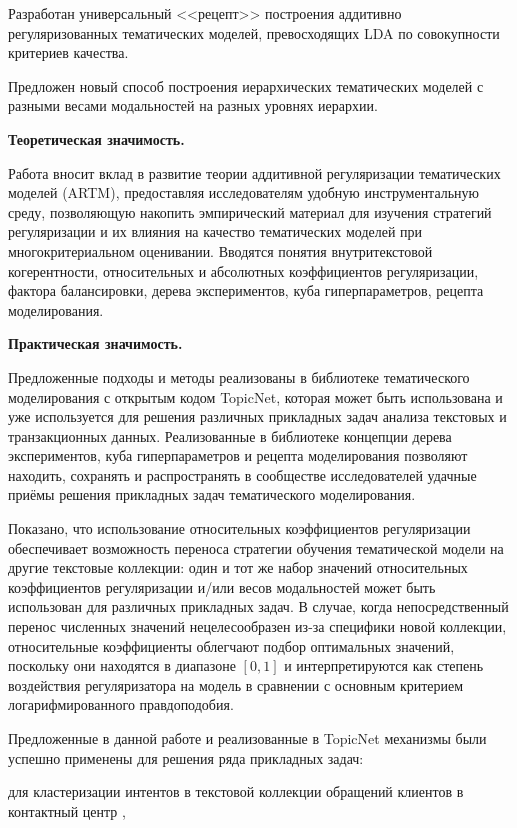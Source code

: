 Разработан универсальный <<рецепт>> построения аддитивно регуляризованных тематических моделей, превосходящих LDA по совокупности критериев качества.

Предложен новый способ построения иерархических тематических моделей с разными весами модальностей на разных уровнях иерархии.

\textbf{Теоретическая значимость.}

Работа вносит вклад в развитие теории аддитивной регуляризации тематических моделей (ARTM), предоставляя исследователям удобную инструментальную среду, позволяющую накопить эмпирический материал для изучения стратегий регуляризации и их влияния на качество тематических моделей при многокритериальном оценивании. Вводятся понятия внутритекстовой когерентности, относительных и абсолютных коэффициентов регуляризации, фактора балансировки, дерева экспериментов, куба гиперпараметров, рецепта моделирования.

\textbf{Практическая значимость.}

Предложенные подходы и методы реализованы в библиотеке тематического моделирования с открытым кодом TopicNet, которая может быть использована и уже используется для решения различных прикладных задач анализа текстовых и транзакционных данных. Реализованные в библиотеке концепции дерева экспериментов, куба гиперпараметров и рецепта моделирования позволяют находить, сохранять и распространять в сообществе исследователей удачные приёмы решения прикладных задач тематического моделирования.

Показано, что использование относительных коэффициентов регуляризации обеспечивает возможность переноса стратегии обучения тематической модели на другие текстовые коллекции: один и тот же набор значений относительных коэффициентов регуляризации и/или весов модальностей может быть использован для различных прикладных задач. В случае, когда непосредственный перенос численных значений нецелесообразен из-за специфики новой коллекции, относительные коэффициенты облегчают подбор оптимальных значений, поскольку они находятся в диапазоне $[0, 1]$ и интерпретируются как степень воздействия регуляризатора на модель в сравнении с основным критерием логарифмированного правдоподобия.

Предложенные в данной работе и реализованные в TopicNet механизмы были успешно применены для решения ряда прикладных задач:

для кластеризации интентов в текстовой коллекции обращений клиентов в контактный центр \cite{popov_hier},

